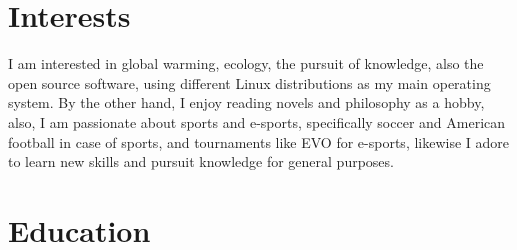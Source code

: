 \documentclass[letterpaper]{twentysecondcv} %
\begin{document}







\makeprofile %


\section{Interests}

I am interested in global warming, ecology, the pursuit of knowledge, also the open source software, using different Linux distributions as my main operating system. By the other hand, I enjoy reading novels and philosophy as a hobby, also, I am passionate about sports and e-sports, specifically soccer and American football in case of sports, and tournaments like EVO for e-sports, likewise I adore to learn new skills and pursuit knowledge for general purposes.


\section{Education}
\end{document}
